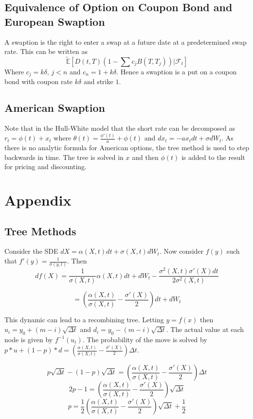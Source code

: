 \documentclass{article}
\theoremstyle{definition}
\begin{document}
 \subsection{Equivalence of Option on Coupon Bond and European Swaption}
 
 A swaption is the right to enter a swap at a future date at a predetermined swap rate.  This can be written as
 \[\mathbb{\tilde{E}} \left[D(t, T)\left(1-\sum c_j B(T, T_j) \right) | \mathcal{F}_t \right]\]
 Where \(c_j=k\delta,\,j<n\) and \(c_n=1+k\delta\).  Hence a swaption is a put on a coupon bond with coupon rate \(k\delta\) and strike \(1\).  
 
\subsection{American Swaption}

Note that in the Hull-White model that the short rate can be decomposed as \(r_t=\phi(t)+x_t\) where \(\theta(t)=\frac{\phi'(t)}{a}+\phi(t)\) and \(dx_t=-ax_t dt+\sigma dW_t\).  As there is no analytic formula for American options, the tree method is used to step backwards in time.  The tree is solved in \(x\) and then \(\phi(t)\) is added to the result for pricing and discounting.  

\section{Appendix}

\subsection{Tree Methods} \label{tree}
Consider the SDE \(dX=\alpha(X, t)dt+\sigma(X, t)dW_t\).  Now consider \(f(y)\) such that \(f'(y)=\frac{1}{\sigma(y, t)}\).  Then \[df(X)=\frac{1}{\sigma(X, t)} \alpha(X, t)dt+dW_t-\frac{\sigma^2(X, t)\sigma'(X)dt}{2\sigma^2(X, t)}\]

\[=\left(\frac{\alpha(X, t)}{\sigma(X, t)}-\frac{\sigma'(X)}{2}\right)dt+dW_t\]
 
 This dynamic can lead to a recombining tree.  Letting \(y=f(x)\) then \(u_i=y_0+(m-i)\sqrt{\Delta t}\) and \(d_i=y_0-(m-i)\sqrt{\Delta t}\).  The actual value at each node is given by \(f^{-1}(u_i)\). The probability of the move is solved by \(p*u+(1-p)*d=\left(\frac{\alpha(X, t)}{\sigma(X, t)}-\frac{\sigma'(X)}{2}\right)\Delta t\). 
 
 \[p\sqrt{\Delta t}-(1-p)\sqrt{\Delta t}=\left(\frac{\alpha(X, t)}{\sigma(X, t)}-\frac{\sigma'(X)}{2}\right)\Delta t\]
  \[2p-1=\left(\frac{\alpha(X, t)}{\sigma(X, t)}-\frac{\sigma'(X)}{2}\right)\sqrt{\Delta t}\]
  \[p=\frac{1}{2}\left(\frac{\alpha(X, t)}{\sigma(X, t)}-\frac{\sigma'(X)}{2}\right)\sqrt{\Delta t}+\frac{1}{2}\]
  
\end{document}
